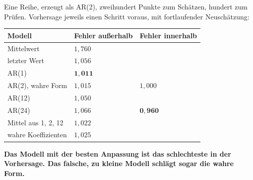 \begin{merksatz}
Eine Reihe, erzeugt als AR(2), zweihundert Punkte zum Schätzen, hundert zum Prüfen. Vorhersage jeweils einen Schritt voraus, mit fortlaufender Neuschätzung:

\begin{center}
{\small
\renewcommand{\arraystretch}{1.48}
\begin{tabular}{@{}P{3.2cm}P{2.4cm}P{2.4cm}@{}}
\toprule
\textbf{Modell} & \textbf{Fehler außerhalb} & \textbf{Fehler innerhalb}\\
\midrule
Mittelwert & $1{,}760$ & \\
letzter Wert & $1{,}056$ & \\
AR(1) & $\mathbf{1{,}011}$ & \\
AR(2), wahre Form & $1{,}015$ & $1{,}000$\\
AR(12) & $1{,}050$ & \\
AR(24) & $1{,}066$ & $\mathbf{0{,}960}$\\
Mittel aus 1, 2, 12 & $1{,}022$ & \\
\midrule
wahre Koeffizienten & $1{,}025$ & \\
\bottomrule
\end{tabular}}
\end{center}

\begin{center}
\begin{minipage}{0.9\textwidth}
\textbf{Das Modell mit der besten Anpassung ist das schlechteste in der Vorhersage. Das falsche, zu kleine Modell schlägt sogar die wahre Form.}
\end{minipage}
\end{center}

\begin{center}
\begin{minipage}{0.88\textwidth}
\end{minipage}
\end{center}
\end{merksatz}

